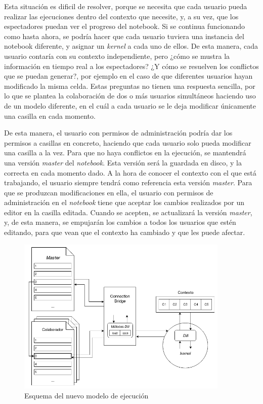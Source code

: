 \documentclass[11pt,spanish,listoffigures]{tfgetsinf}
\begin{document}
Esta situación es dificil de resolver, porque se necesita que cada usuario pueda realizar las ejecuciones dentro del contexto que necesite, y, a su vez, que los espectadores puedan ver el progreso del notebook. Si se continua funcionando como hasta ahora, se podría hacer que cada usuario tuviera una instancia del notebook diferente, y asignar un \textit{kernel} a cada uno de ellos. De esta manera, cada usuario contaría con su contexto independiente, pero ¿cómo se mustra la información en tiempo real a los espectadores? ¿Y cómo se resuelven los conflictos que se puedan generar?, por ejemplo en el caso de que diferentes usuarios hayan modificado la misma celda. Estas preguntas no tienen una respuesta sencilla, por lo que se plantea la colaboración de dos o más usuarios simultáneos haciendo uso de un modelo diferente, en el cuál a cada usuario se le deja modificar únicamente una casilla en cada momento.

De esta manera, el usuario con permisos de administración podría dar los permisos a casillas en concreto, haciendo que cada usuario solo pueda modificar una casilla a la vez. Para que no haya conflictos en la ejecución, se mantendrá una versión \textit{master} del \textit{notebook}. Esta versión será la guardada en disco, y la correcta en cada momento dado. A la hora de conocer el contexto con el que está trabajando, el usuario siempre tendrá como referencia esta versión \textit{master}. Para que se produzcan modificaciones en ella, el usuario con permisos de administración en el \textit{notebook} tiene que aceptar los cambios realizados por un editor en la casilla editada. Cuando se acepten, se actualizará la versión \textit{master}, y, de esta manera, se empujarán los cambios a todos los usuarios que estén editando, para que vean que el contexto ha cambiado y que les puede afectar.

\begin{figure}[H]
	\centering
  	\includegraphics[width=0.9\textwidth]{mejora_ejecucion.png}
  	\caption{Esquema del nuevo modelo de ejecución}
  	\label{fig:new-exec}
\end{figure}
\end{document}
